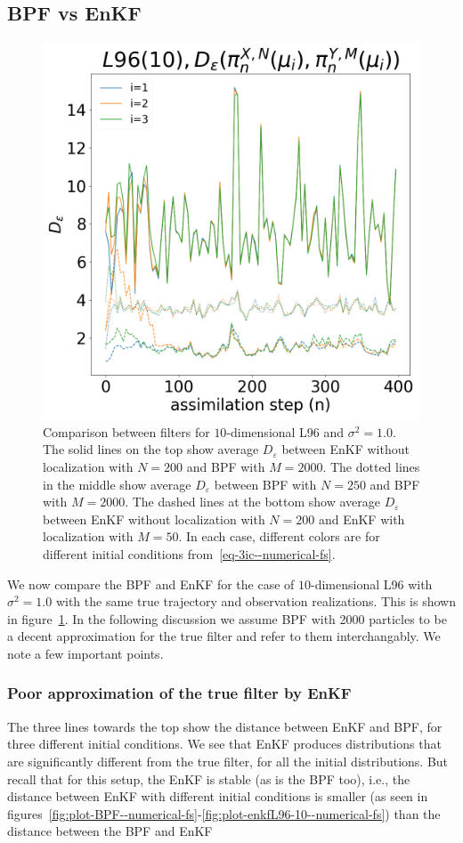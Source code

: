 \subsection{BPF vs EnKF}
\begin{figure}
\centering
\includegraphics[width=0.8\columnwidth]{stability/plots/figures-BPF-L96_10-EnKF-distance between different filters.png}
\caption{Comparison between filters for $10$-dimensional L96 and $\sigma^2=1.0$. The solid lines on the top show average $D_\varepsilon$ between EnKF without localization with $N = 200$ and BPF with $M = 2000$. The dotted lines in the middle show average  $D_\varepsilon$ between  BPF with $N = 250$ and BPF with $M = 2000$. The dashed lines at the bottom show average  $D_\varepsilon$ between EnKF without localization with $N = 200$ and EnKF with localization with $M = 50$. In each case, different colors are for different initial conditions from~\eqref{eq-3ic--numerical-fs}.} 
\label{fig:plot-compare--numerical-fs}
\end{figure}
We now compare the BPF and EnKF for the case of $10$-dimensional L96 with $\sigma^2=1.0$ with the same true trajectory and observation realizations. This is shown in figure~\ref{fig:plot-compare--numerical-fs}. {In the following discussion we assume BPF with 2000 particles to be a decent approximation for the true filter and refer to them interchangably.} We note a few important points.
\subsubsection{Poor approximation of the true filter by EnKF} The three lines towards the top show the distance between EnKF and BPF, for three different initial conditions. We see that EnKF produces distributions that are significantly different from the true filter, for all the initial distributions. But recall that for this setup, the EnKF is stable (as is the BPF too), i.e., the distance between EnKF with different initial conditions is smaller (as seen in figures~\ref{fig:plot-BPF--numerical-fs}-\ref{fig:plot-enkfL96-10--numerical-fs}) than the distance between the BPF and EnKF

